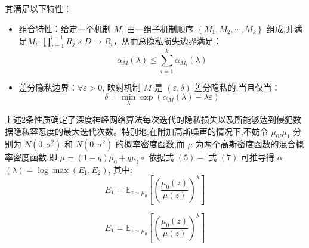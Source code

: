 其满足以下特性：

\begin{itemize}
\item 组合特性：给定一个机制 $M$, 由一组子机制顺序 $\left\{M_{1}, M_{2}, \cdots, M_{k}\right\}$ 组成,并满足$M_{i}: \prod_{j=1}^{i-1} R_{j} \times D \rightarrow R_{i}$，从而总隐私损失边界满足：
\begin{equation}\label{eq:损失边界值定义2}
\alpha_{M}(\lambda) \leqslant \sum_{i=1}^{k} \alpha_{M_{i}}(\lambda)
\end{equation}

\item 差分隐私边界：$\forall \varepsilon>0$, 映射机制 $M$ 是 $(\varepsilon, \delta)$ 差分隐私的,当且仅当：
\begin{equation}\label{eq:损失边界值定义2}
\delta=\min _{\lambda} \exp \left(\alpha_{M}(\lambda)-\lambda \varepsilon\right)
\end{equation}
\end{itemize}

上述2条性质确定了深度神经网络算法每次迭代的隐私损失以及所能够达到侵犯数据隐私容忍度的最大迭代次数。特别地,在附加高斯噪声的情况下,不妨令 $\mu_{0}$,$\mu_{1}$ 分别为 $N\left(0, \sigma^{2}\right)$ 和 $N\left(0, \sigma^{2}\right)$ 的概率密度函数,而 $\mu$ 为两个高斯密度函数的混合概率密度函数,即 $\mu=(1-q) \mu_{0}+q \mu_{1} \circ$ 依据式 $(5)-$ 式 $(7)$ 可推导得 $\alpha$ $(\lambda)=\log \max \left(E_{1}, E_{2}\right)$, 其中:
\begin{equation}\label{eq:隐私容忍1}
E_{1}=\mathbb{E}_{z \sim \mu_{0}}\left[\left(\frac{\mu_{0}(z)}{\mu(z)}\right)^{\lambda}\right]
\end{equation}

\begin{equation}\label{eq:隐私容忍2}
E_{1}=\mathbb{E}_{z \sim \mu_{0}}\left[\left(\frac{\mu_{0}(z)}{\mu(z)}\right)^{\lambda}\right]
\end{equation}


